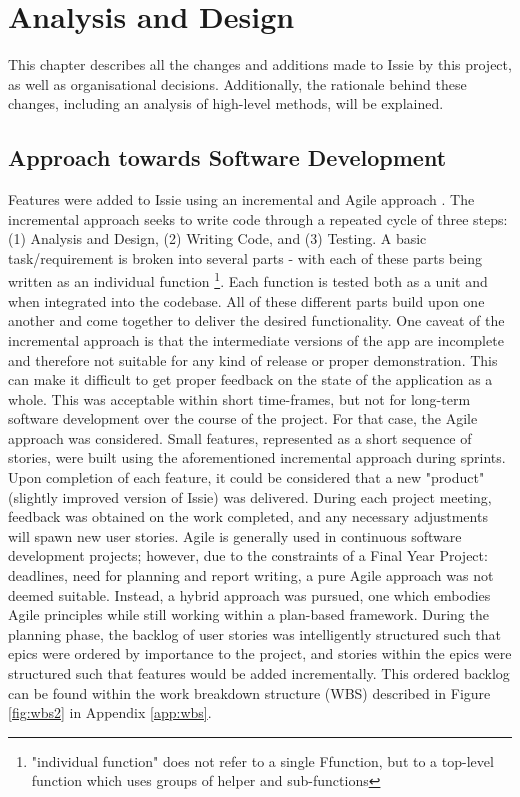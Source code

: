 \chapter{Analysis and Design}
This chapter describes all the changes and additions made to Issie by this project, as well as organisational decisions. Additionally, the rationale behind these changes, including an analysis of high-level methods, will be explained. 
\section{Approach towards Software Development}
Features were added to Issie using an incremental and Agile approach \cite{Voorhees2020}.
The incremental approach seeks to write code through a repeated cycle of three steps: (1) Analysis and Design, (2) Writing Code, and (3) Testing. A basic task/requirement is broken into several parts - with each of these parts being written as an individual function \footnote{"individual function" does not refer to a single F\fsharp function, but to a top-level function which uses groups of helper and sub-functions}. Each function is tested both as a unit and when integrated into the codebase. All of these different parts build upon one another and come together to deliver the desired functionality. One caveat of the incremental approach is that the intermediate versions of the app are incomplete and therefore not suitable for any kind of release or proper demonstration. This can make it difficult to get proper feedback on the state of the application as a whole. This was acceptable within short time-frames, but not for long-term software development over the course of the project. For that case, the Agile approach was considered. Small features, represented as a short sequence of stories, were built using the aforementioned incremental approach during sprints. Upon completion of each feature, it could be considered that a new "product" (slightly improved version of Issie) was delivered. During each project meeting, feedback was obtained on the work completed, and any necessary adjustments will spawn new user stories. Agile is generally used in continuous software development projects; however, due to the constraints of a Final Year Project: deadlines, need for planning and report writing, a pure Agile approach was not deemed suitable. Instead, a hybrid approach was pursued, one which embodies Agile principles while still working within a plan-based framework. During the planning phase, the backlog of user stories was intelligently structured such that epics were ordered by importance to the project, and stories within the epics were structured such that features would be added incrementally. This ordered backlog can be found within the work breakdown structure (WBS) described in Figure \ref{fig:wbs2} in Appendix \ref{app:wbs}.
